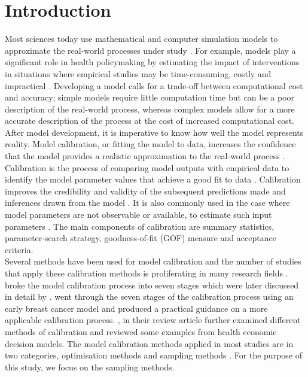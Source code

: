 \chapter{Introduction}
\label{chp:Intro}
Most sciences today use mathematical and computer simulation models to approximate the real-world processes under study \cite{Kennedy,Fojo,Vanni}. For example, models play a significant role in health policymaking by estimating the impact of interventions in situations where empirical studies may be time-consuming, costly and impractical \cite{Stout}. Developing a model calls for a trade-off between computational cost and accuracy; simple models require little computation time but can be a poor description of the real-world process, whereas complex models allow for a more accurate description of the process at the cost of increased computational cost. After model development, it is imperative to know how well the model represents reality. Model calibration, or fitting the model to data, increases the confidence that the model provides a realistic approximation to the real-world process \cite{Vanni,Stout}.\\
    
Calibration is the process of comparing model outputs with empirical data to identify the model parameter values that achieve a good fit to data \cite{Menzies,Vanni}. Calibration improves the credibility and validity of the subsequent predictions made and inferences drawn from the model \cite{Stout}. It is also commonly used in the case where model parameters are not observable or available, to estimate such input parameters \cite{Elske}.  The main components of calibration are summary statistics, parameter-search strategy, goodness-of-fit (GOF) measure and acceptance criteria. \\

Several methods have been used for model calibration and the number of studies that apply these calibration methods is proliferating in many research fields \cite{Vanni}. \cite{Stout} broke the model calibration process into seven stages which were later discussed in detail by \cite{Vanni}. \cite{Karnon} went through the seven stages of the calibration process using an early breast cancer model and produced a practical guidance on a more applicable calibration process. \cite{Vanni}, in their review article further examined different methods of calibration and reviewed some examples from health economic decision models. The model calibration methods applied in most studies are in two categories, optimisation methods and sampling methods  \cite{Menzies}. For the purpose of this study, we focus on the sampling methods.\\
 
